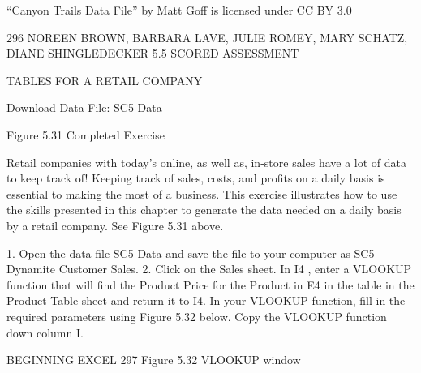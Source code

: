 “Canyon Trails Data File” by Matt Goff is licensed under CC BY 3.0




296 NOREEN BROWN, BARBARA LAVE, JULIE ROMEY, MARY SCHATZ, DIANE SHINGLEDECKER
5.5 SCORED ASSESSMENT




TABLES FOR A RETAIL COMPANY

Download Data File: SC5 Data




Figure 5.31 Completed Exercise


Retail companies with today’s online, as well as, in-store sales have a lot of data to keep track of!
Keeping track of sales, costs, and profits on a daily basis is essential to making the most of a business.
This exercise illustrates how to use the skills presented in this chapter to generate the data needed on
a daily basis by a retail company. See Figure 5.31 above.

1. Open the data file SC5 Data and save the file to your computer as SC5 Dynamite Customer
Sales.
2. Click on the Sales sheet. In I4 , enter a VLOOKUP function that will find the Product Price for
the Product in E4 in the table in the Product Table sheet and return it to I4. In your VLOOKUP
function, fill in the required parameters using Figure 5.32 below. Copy the VLOOKUP function
down column I.




BEGINNING EXCEL 297
Figure 5.32 VLOOKUP window


